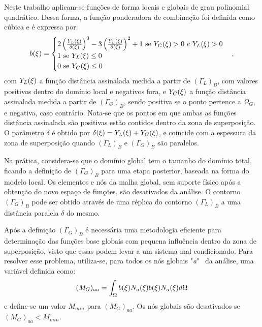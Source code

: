 Neste trabalho aplicam-se funções de forma locais e globais de grau polinomial quadrático. Dessa forma, a função ponderadora de combinação foi definida como cúbica e é expressa por:
\begin{align}
	b(\xi) =  \begin{cases} 2\left(\frac{Y_{L}(\xi)}{\delta(\xi)}\right)^3  -   3\left(\frac{Y_{L}(\xi)}{\delta(\xi)}\right)^2 + 1  \ \mbox{se } Y_{G}(\xi)> 0 \ e \ Y_{L}(\xi)> 0 \\
		1  \ \mbox{se} \ Y_{L}(\xi) \leq 0  \\
		0  \ \mbox{se} \ Y_{G}(\xi) \leq 0 \end{cases},
\end{align}
\noindent com $Y_{L}(\xi)$ a função distância assinalada medida a partir de $(\Gamma_{L})_{B}$, com valores positivos dentro do domínio local e negativos fora, e $Y_{G}(\xi)$ a função distância assinalada medida a partir de $(\Gamma_{G})_{B}$, sendo positiva se o ponto pertence a $\Omega_{G}$, e negativa, caso contrário. Nota-se que os pontos em que ambas as funções distância assinalada são positivas estão contidos dentro da zona de superposição. O parâmetro $\delta$ é obtido por $\delta(\xi) = Y_{L}(\xi) + Y_{G}(\xi)$, e coincide com a espessura da zona de superposição quando $(\Gamma_{L})_{B}$ e $(\Gamma_{G})_{B}$ são paralelos.

Na prática, considera-se que o domínio global tem o tamanho do domínio total, ficando a definição de $(\Gamma_{G})_{B}$ para uma etapa posterior, baseada na forma do modelo local. Os elementos e nós da malha global, sem suporte físico após a obtenção do novo espaço de funções, são desativados da análise. O contorno $(\Gamma_{G})_{B}$ pode ser obtido através de uma réplica do contorno $(\Gamma_{L})_{B}$ a uma distância paralela $\delta$ do mesmo. 

Após a definição $(\Gamma_{G})_{B}$ é necessária uma metodologia eficiente para determinação das funções base globais com pequena influência dentro da zona de superposição, visto que essas podem levar a um sistema mal condicionado. Para resolver esse problema, utiliza-se, para todos os nós globais "\textit{a}" \ da análise, uma variável definida como:
\begin{align}
	(M_{G})_{aa} = \int_{\Omega}b(\xi)N_{a}(\xi)b(\xi)N_{a}(\xi)d\Omega \label{eq:influence}
\end{align}
\noindent e define-se um valor $M_{min}$ para $(M_{G})_{aa}$. Os nós globais são desativados se $(M_{G})_{aa} < M_{min}$. 

